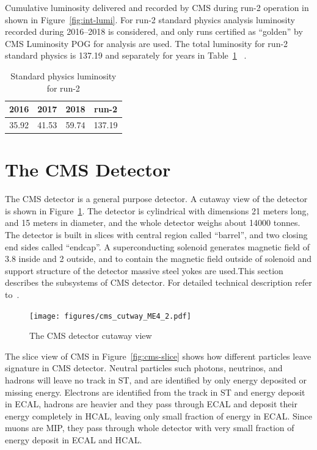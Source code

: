 Cumulative luminosity delivered and recorded by \gls{CMS} during run-2 operation
in shown in Figure~\ref{fig:int-lumi}.
For run-2 standard physics analysis luminosity recorded during
2016--2018 is considered, and only runs certified as ``golden'' by \gls{CMS}
Luminosity \gls{POG} for analysis are used. The total luminosity for run-2
standard physics is 137.19\fbinv{}
and separately for years in Table~\ref{tab:years-lumi}
~\cite{CMS-PAS-LUM-17-001,CMS-PAS-LUM-17-004,CMS-PAS-LUM-18-002}.

\begin{table}[!ht]
  \centering
  \caption[Standard physics luminosity for run-2]%
  {Standard physics luminosity for run-2}
  \begin{tabular}{cccc}
    \toprule
    2016          & 2017          & 2018          & run-2          \\ \midrule
    35.92\fbinv{} & 41.53\fbinv{} & 59.74\fbinv{} & 137.19\fbinv{} \\
    \bottomrule
  \end{tabular}%
  \label{tab:years-lumi}
\end{table}

\section{
  The CMS Detector
 }\label{ch_cms:cms}

The \gls{CMS} detector is a general purpose detector.
A cutaway view of the detector is shown in Figure~\ref{fig:cms-cutaway}.
The detector is cylindrical with dimensions 21 meters long, and 15 meters
in diameter, and the whole detector weighs about 14000 tonnes.
The detector is built in slices with central region called ``barrel'',
and two closing end sides called ``endcap''.
A superconducting solenoid generates magnetic field of 3.8\Tesla{} inside
and 2\Tesla{} outside, and to contain the magnetic field outside of solenoid
and support structure of the detector massive steel yokes are used.This section
describes the subsystems of \gls{CMS} detector. For detailed technical
description refer to~\cite{CMS-JINST-S08004}.

\begin{figure}[!ht]
  \centering
  \texttt{[image: figures/cms\_cutway\_ME4\_2.pdf]}
  \caption[The CMS detector cutaway view]%
  {The CMS detector cutaway view~\cite{image-cms-cutway}}%
  \label{fig:cms-cutaway}
\end{figure}

The slice view of \gls{CMS} in Figure~\ref{fig:cms-slice}
shows how different particles leave signature in \gls{CMS} detector.
Neutral particles such photons, neutrinos, and hadrons will leave no track
in \gls{ST}, and are identified by only energy deposited or missing energy.
Electrons are identified from the track in \gls{ST} and energy deposit
in \gls{ECAL}, hadrons are heavier and they pass through \gls{ECAL}
and deposit their energy completely in \gls{HCAL}, leaving only small fraction
of energy in \gls{ECAL}.
Since muons are \gls{MIP}, they pass through whole detector with very small
fraction of energy deposit in \gls{ECAL} and \gls{HCAL}.

